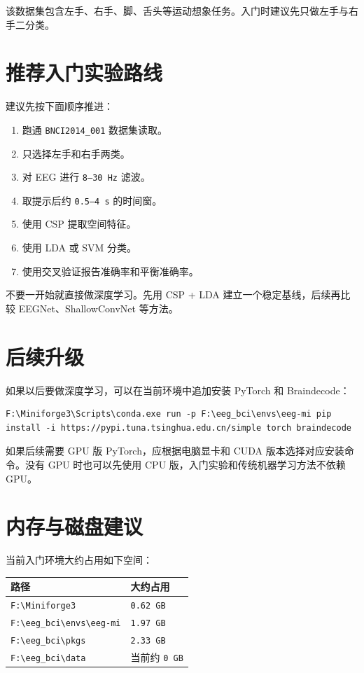 \documentclass[UTF8,a4paper,12pt]{ctexart}
\begin{document}
该数据集包含左手、右手、脚、舌头等运动想象任务。入门时建议先只做左手与右手二分类。

\section{推荐入门实验路线}

建议先按下面顺序推进：

\begin{enumerate}[label=\arabic*.]
  \item 跑通 \texttt{BNCI2014\_001} 数据集读取。
  \item 只选择左手和右手两类。
  \item 对 EEG 进行 \texttt{8--30 Hz} 滤波。
  \item 取提示后约 \texttt{0.5--4 s} 的时间窗。
  \item 使用 CSP 提取空间特征。
  \item 使用 LDA 或 SVM 分类。
  \item 使用交叉验证报告准确率和平衡准确率。
\end{enumerate}

不要一开始就直接做深度学习。先用 CSP + LDA 建立一个稳定基线，后续再比较 EEGNet、ShallowConvNet 等方法。

\section{后续升级}

如果以后要做深度学习，可以在当前环境中追加安装 PyTorch 和 Braindecode：

\begin{lstlisting}[language={},caption={升级到深度学习环境}]
F:\Miniforge3\Scripts\conda.exe run -p F:\eeg_bci\envs\eeg-mi pip install -i https://pypi.tuna.tsinghua.edu.cn/simple torch braindecode
\end{lstlisting}

如果后续需要 GPU 版 PyTorch，应根据电脑显卡和 CUDA 版本选择对应安装命令。没有 GPU 时也可以先使用 CPU 版，入门实验和传统机器学习方法不依赖 GPU。

\section{内存与磁盘建议}

当前入门环境大约占用如下空间：

\begin{table}[h]
\centering
\begin{tabular}{ll}
\toprule
路径 & 大约占用 \\
\midrule
\texttt{F:\textbackslash Miniforge3} & \texttt{0.62 GB} \\
\texttt{F:\textbackslash eeg\_bci\textbackslash envs\textbackslash eeg-mi} & \texttt{1.97 GB} \\
\texttt{F:\textbackslash eeg\_bci\textbackslash pkgs} & \texttt{2.33 GB} \\
\texttt{F:\textbackslash eeg\_bci\textbackslash data} & 当前约 \texttt{0 GB} \\
\bottomrule
\end{tabular}
\end{table}
\end{document}
